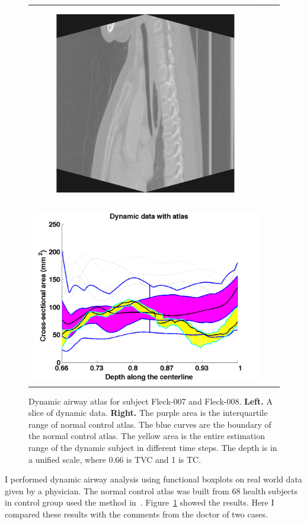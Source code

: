 \begin{figure}[tb]
\begin{center}
\begin{tabular}{ccc}
    \includegraphics[height=\figheight] {fig/Fleck_008.png}
    \includegraphics[width=\figwidth] {fig/Fleck_008_wfbplot.png} \\
    \end{tabular}
    \caption{ \label{fig:Fleck} Dynamic airway atlas for subject Fleck-007 and Fleck-008. {\bf Left.} A slice of dynamic data. {\bf Right.} The purple area is the interquartile range of normal control atlas. The blue curves are the boundary of the normal control atlas. The yellow area is the entire estimation range of the dynamic subject in different time steps. The depth is in a unified scale, where 0.66 is TVC and 1 is TC.
    }
  \end{center}
\end{figure}
I performed dynamic airway analysis using functional boxplots on real world data given by a physician.
The normal control atlas was built from 68 health subjects in control group used the method in~\cite{hong2014statistical}.
Figure~\ref{fig:Fleck} showed the results.
Here I compared these results with the comments from the doctor of two cases.

